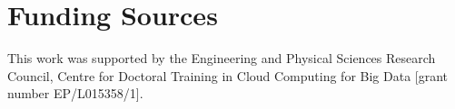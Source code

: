 \documentclass[final,3p,times,twocolumn,numbers]{elsarticle}
\begin{document}
\section{Funding Sources}

This work was supported by the Engineering and Physical Sciences Research Council, Centre for Doctoral Training in Cloud Computing for Big Data [grant number EP/L015358/1].







   
  


%
%
%
\end{document}

